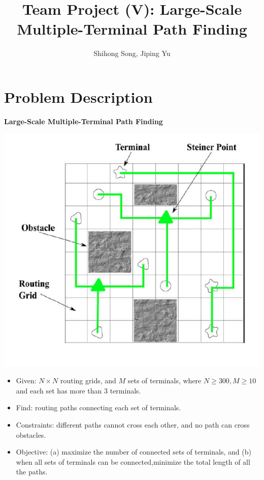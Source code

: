 \documentclass[12pt, a4paper]{article}
\title{Team Project (V): Large-Scale Multiple-Terminal Path Finding}
\author{Shihong Song, Jiping Yu}
\begin{document}
	\sloppypar

	\maketitle
	
	\tableofcontents
	\newpage
	
	\section{Problem Description}
	
		\begin{center}
			\textbf{Large-Scale Multiple-Terminal Path Finding}
		\end{center}
		
		\includegraphics{problem.png}
		
		\begin{itemize}
		
		\item Given: $N \times N$ routing grids, and $M$ sets of terminals, where $N \geq 300, M \geq 10$ and each set has more than 3 terminals.
		\item Find: routing paths connecting each set of terminals.
		\item Constraints: different paths cannot cross each other, and no path can cross obstacles.
		\item Objective: (a) maximize the number of connected sets of terminals, and (b) when all sets of terminals can be connected,minimize the total length of all the paths.
		
		\end{itemize}
	
\end{document}
